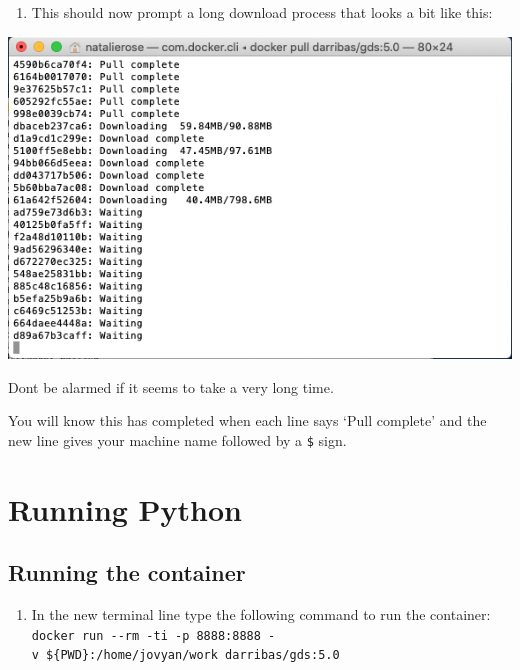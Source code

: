 \documentclass[
]{book}
\providecommand{\tightlist}{%
  \setlength{\itemsep}{0pt}\setlength{\parskip}{0pt}}
\begin{document}
\begin{enumerate}
\def\labelenumi{\arabic{enumi}.}
\setcounter{enumi}{2}
\tightlist
\item
  This should now prompt a long download process that looks a bit like this:
\end{enumerate}

\begin{center}\includegraphics[width=7.94in]{figs/chp1/Figure6} \end{center}

Dont be alarmed if it seems to take a very long time.

You will know this has completed when each line says `Pull complete' and the new line gives your machine name followed by a \texttt{\$} sign.

\hypertarget{running-python}{%
\section*{Running Python}\label{running-python}}

\hypertarget{running-the-container}{%
\subsection*{Running the container}\label{running-the-container}}

\begin{enumerate}
\def\labelenumi{\arabic{enumi}.}
\tightlist
\item
  In the new terminal line type the following command to run the container: \texttt{docker\ run\ -\/-rm\ -ti\ -p\ 8888:8888\ -v\ \$\{PWD\}:/home/jovyan/work\ darribas/gds:5.0}
\end{enumerate}
\end{document}
